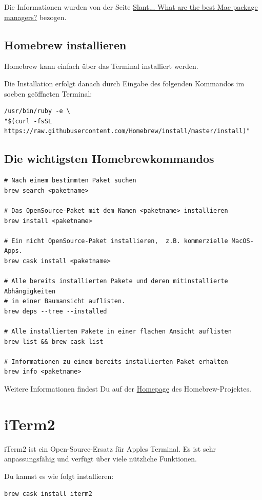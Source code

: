 \documentclass[]{article}
\begin{document}
Die Informationen wurden von der Seite \href{https://www.slant.co/topics/511/~best-mac-package-managers#3}{Slant...  What are the best Mac package managers?} bezogen.

\subsection{Homebrew installieren}
Homebrew kann einfach über das Terminal installiert werden.

Die Installation erfolgt danach durch Eingabe des folgenden Kommandos im soeben geöffneten Terminal:
\begin{verbatim}
/usr/bin/ruby -e \
"$(curl -fsSL https://raw.githubusercontent.com/Homebrew/install/master/install)"
\end{verbatim}

\subsection{Die wichtigsten Homebrewkommandos}
\begin{verbatim}
# Nach einem bestimmten Paket suchen
brew search <paketname> 

# Das OpenSource-Paket mit dem Namen <paketname> installieren
brew install <paketname>

# Ein nicht OpenSource-Paket installieren,  z.B. kommerzielle MacOS-Apps.
brew cask install <paketname>  

# Alle bereits installierten Pakete und deren mitinstallierte Abhängigkeiten 
# in einer Baumansicht auflisten.
brew deps --tree --installed

# Alle installierten Pakete in einer flachen Ansicht auflisten
brew list && brew cask list

# Informationen zu einem bereits installierten Paket erhalten
brew info <paketname> 
\end{verbatim}

Weitere Informationen findest Du auf der \href{https://brew.sh/index_de}{Homepage} des Homebrew-Projektes.

\section{iTerm2}
iTerm2 ist ein Open-Source-Ersatz für Apples Terminal. Es ist sehr anpassungsfähig und verfügt über viele nützliche Funktionen.

Du kannst es wie folgt installieren:
\begin{verbatim}
brew cask install iterm2
\end{verbatim}
\end{document}
